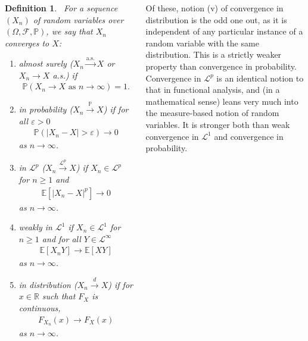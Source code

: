 \documentclass{tikzposter} %
\newtheorem{definition}{Definition}
\begin{document}
\begin{columns}
{    \begin{definition}
    \ For a sequence $(X_{n})$ of random variables over $(\Omega, \mathcal{F}, \mathbb{P})$, we say that $X_{n}$ converges to $X$:
    \begin{enumerate}[label=\roman*.]
            \item almost surely ($X_{n} \overset{\mathrm{a.s.}}{\to} X$ or $X_{n} \to X$ a.s.) if
            \begin{align*}
              \mathbb{P}(X_{n} \to X \text{ as } n \to \infty) = 1.
            \end{align*}
            \item in probability ($X_{n} \overset{\mathbb{P}}{\to} X$) if for all $\varepsilon > 0$
            \begin{align*}
              \mathbb{P}(|X_{n}-X| > \varepsilon) \to 0
            \end{align*}
            as $n \to \infty$.
      \item in $\mathcal{L}^{p}$ ($X_{n} \overset{\mathcal{L}^{p}}{\to} X$) if $X_{n} \in \mathcal{L}^{p}$ for $n \ge 1$ and
          \begin{align*}
            \mathbb{E}[|X_{n}-X|^{p}] \to 0
          \end{align*}
            as $n \to \infty$.
      \item weakly in $\mathcal{L}^{1}$ if $X_{n} \in \mathcal{L}^{1}$ for $n \ge 1$ and for all $Y \in \mathcal{L}^{\infty}$
            \begin{align*}
              \mathbb{E}[X_{n}Y] \to \mathbb{E}[XY]
            \end{align*}
            as $n \to \infty$.
            \item in distribution ($X_{n} \overset{d}{\to} X$) if for $x \in \mathbb{R}$ such that $F_{X}$ is continuous,
            \begin{align*}
              F_{X_{n}}(x) \to F_{X}(x)
            \end{align*}
            as $n \to \infty$.
    \end{enumerate}
    \end{definition}
    \hphantom{}

    Of these, notion (v) of convergence in distribution is the odd one out, as it is independent of any particular instance of a random variable with the same distribution. This is a strictly weaker property than convergence in probability. \\

    Convergence in $\mathcal{L}^{p}$ is an identical notion to that in functional analysis, and (in a mathematical sense) leans very much into the measure-based notion of random variables. It is stronger both than weak convergence in $\mathcal{L}^{1}$ and convergence in probability. \\

}
\end{columns}
\end{document}
